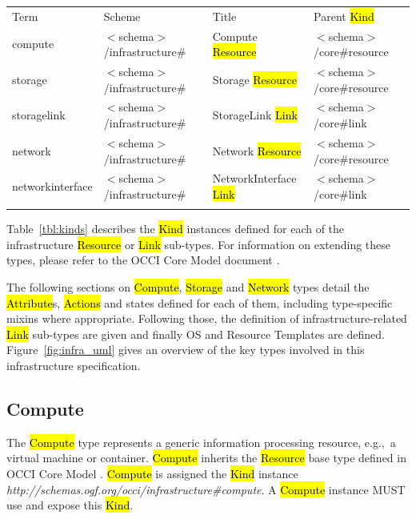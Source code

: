 \documentclass[10pt,a4paper]{article}
\begin{document}
 {
	\begin{tabular}{llll}
	\toprule
	Term & Scheme & Title & Parent \hl{Kind} \\
	\colrule
	compute &  $<$schema$>$/infrastructure\# & Compute \hl{Resource}
	& $<$schema$>$/core\#resource \\

	storage & $<$schema$>$/infrastructure\# & Storage \hl{Resource}
	& $<$schema$>$/core\#resource \\

	storagelink & $<$schema$>$/infrastructure\# & StorageLink \hl{Link}
	& $<$schema$>$/core\#link \\

	network & $<$schema$>$/infrastructure\# & Network \hl{Resource}
	& $<$schema$>$/core\#resource \\

	networkinterface & $<$schema$>$/infrastructure\# & NetworkInterface \hl{Link}
	& $<$schema$>$/core\#link \\

	\botrule
	\end{tabular}
}

Table~\ref{tbl:kinds} describes the \hl{Kind} instances defined for
each of the infrastructure \hl{Resource} or \hl{Link} sub-types. For
information on extending these types, please refer to the OCCI Core
Model document \cite{occi:core}.

The following sections on \hl{Compute}, \hl{Storage} and \hl{Network}
types detail the \hl{Attribute}s, \hl{Actions} and states defined for
each of them, including type-specific mixins where appropriate.
Following those, the definition of infrastructure-related \hl{Link}
sub-types are given and finally OS and Resource Templates
are defined. Figure~\ref{fig:infra_uml} gives an overview of
the key types involved in this infrastructure specification.

\subsection{Compute}
The \hl{Compute} type represents a generic information processing
resource, e.g.,~a virtual machine or container. \hl{Compute} inherits
the \hl{Resource} base type defined in OCCI Core Model
\cite{occi:core}.  \hl{Compute} is assigned the \hl{Kind} instance
\textit{http://schemas.ogf.org/occi/infrastructure\#compute}.  A
\hl{Compute} instance MUST use and expose this \hl{Kind}.
\end{document}
